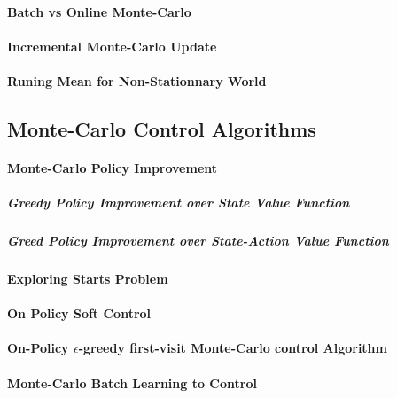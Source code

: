 		\paragraph*{Batch vs Online Monte-Carlo}

		\paragraph*{Incremental Monte-Carlo Update}

		\paragraph*{Runing Mean for Non-Stationnary World}

	\subsection{Monte-Carlo Control Algorithms} %
		\label{sub:monte_carlo_control_algorithms}
	
		\paragraph*{Monte-Carlo Policy Improvement}

			\subparagraph*{Greedy Policy Improvement over State Value Function}

			\subparagraph*{Greed Policy Improvement over State-Action Value Function}

		\paragraph*{Exploring Starts Problem}

		\paragraph*{On Policy Soft Control}
		
		\paragraph*{On-Policy $\epsilon$-greedy first-visit Monte-Carlo control Algorithm}

		\paragraph*{Monte-Carlo Batch Learning to Control}

